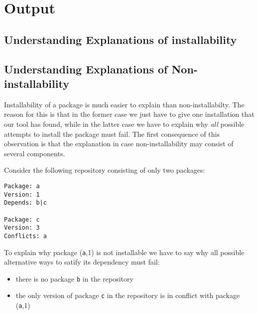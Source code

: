 
\section{Output}
\label{sec:output}

\subsection{Understanding Explanations of installability}



\subsection{Understanding Explanations of Non-installability}

Installability of a package is much easier to explain than
non-installabilty. The reason for this is that in the former case we
just have to give one installation that our tool has found, while in
the latter case we have to explain why \emph{all} possible attempts to
install the package must fail. The first consequence of this
observation is that the explanation in case non-installability may
consist of several components.

\begin{example}
  Consider the following repository consisting of only two packages:
\begin{verbatim}
Package: a
Version: 1
Depends: b|c

Package: c
Version: 3
Conflicts: a
\end{verbatim}
To explain why package (\texttt{a},1) is not installable we have to
say why all possible alternative ways to satify its dependency must
fail:
\begin{itemize}
\item there is no package \texttt{b} in the repository
\item the only version of package \texttt{c} in the repository is in
  conflict with package (\texttt{a},1)
\end{itemize}
\end{example}

